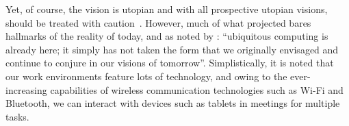 Yet, of course, the vision is utopian and with all prospective utopian visions, should be treated with caution~\citep{Bell2007}. %
However, much of what \citet{Weiser1991} projected bares hallmarks of the reality of today, and as noted by \citet[p. 135]{Bell2007}: ``ubiquitous computing is already here; it simply has not taken the form that we originally envisaged and continue to conjure in our visions of tomorrow''.
Simplistically, it is noted that our work environments feature lots of technology, and owing to the ever-increasing capabilities of wireless communication technologies such as Wi-Fi and Bluetooth, we can interact with devices such as tablets in meetings for multiple tasks.


